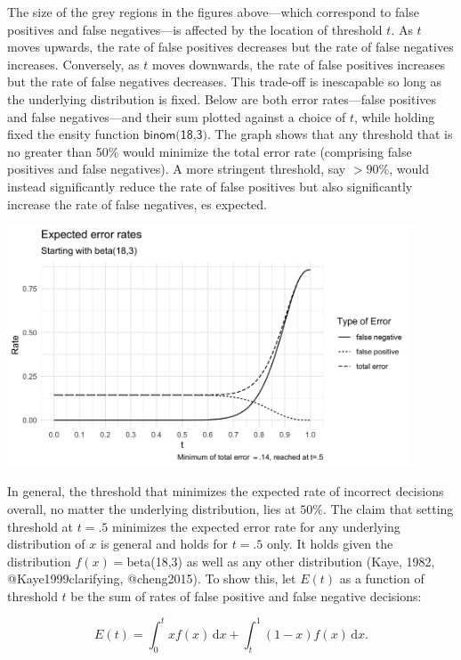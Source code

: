 \documentclass[10pt,dvipsnames]{scrartcl}
\begin{document}
The size of the grey regions in the figures above---which correspond to
false positives and false negatives---is affected by the location of
threshold \(t\). As \(t\) moves upwards, the rate of false positives
decreases but the rate of false negatives increases. Conversely, as
\(t\) moves downwards, the rate of false positives increases but the
rate of false negatives decreases. This trade-off is inescapable so long
as the underlying distribution is fixed. Below are both error
rates---false positives and false negatives---and their sum plotted
against a choice of \(t\), while holding fixed the ensity function
\(\textsf{binom(18,3)}\). The graph shows that any threshold that is no
greater than 50\% would minimize the total error rate (comprising false
positives and false negatives). A more stringent threshold, say
\(>90\%\), would instead significantly reduce the rate of false
positives but also significantly increase the rate of false negatives,
es expected.

\begin{center}
    \includegraphics[width=12cm]{errors.png}
\end{center}

In general, the threshold that minimizes the expected rate of incorrect
decisions overall, no matter the underlying distribution, lies at
\(50\%\). The claim that setting threshold at \(t=.5\) minimizes the
expected error rate for any underlying distribution of \(x\) is general
and holds for \(t=.5\) only. It holds given the distribution
\(f(x)=\)beta(18,3) as well as any other distribution (Kaye, 1982,
@Kaye1999clarifying, @cheng2015). To show this, let \(E(t)\) as a
function of threshold \(t\) be the sum of rates of false positive and
false negative decisions:

\[E(t) = \int_0^t \! x f(x) \, \mathrm{d}x + \int_t^1 \! (1-x) f(x) \, \mathrm{d}x.
\]
\end{document}
